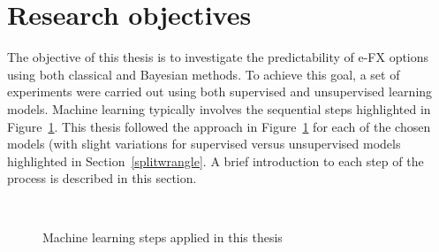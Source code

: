 \section{Research objectives}\label{Ch1Sec4}

The objective of this thesis is to investigate the predictability of e-FX options using both classical and Bayesian methods. To achieve this goal, a set of experiments were carried out using both supervised and unsupervised learning models. Machine learning typically involves the sequential steps highlighted in Figure~\ref{Ch1Fig:4}. This thesis followed the approach in Figure~\ref{Ch1Fig:4} for each of the chosen models (with slight variations for supervised versus unsupervised models highlighted in Section~\ref{splitwrangle}. A brief introduction to each step of the process is described in this section.

\begin{figure}[!ht]\centering
    \strut\\
    \caption{Machine learning steps applied in this thesis}\label{Ch1Fig:4}
\end{figure}

